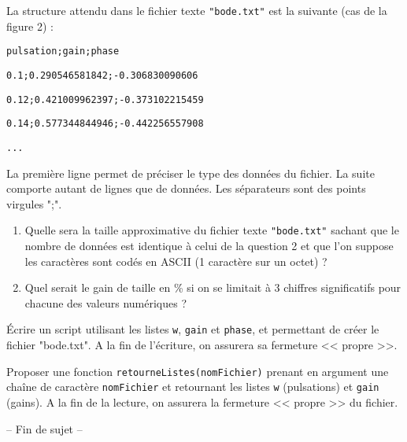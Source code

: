 La structure attendu dans le fichier texte \texttt{"bode.txt"} est la suivante (cas de la figure 2) :

\begin{dBox}
\hspace{0.5 cm} \texttt{pulsation;gain;phase}

\texttt{0.1;0.290546581842;-0.306830090606}

\texttt{0.12;0.421009962397;-0.373102215459}

\texttt{0.14;0.577344844946;-0.442256557908}

\texttt{...}
\end{dBox}

\begin{remark}
La première ligne permet de préciser le type des données du fichier.
La suite comporte autant de lignes que de données. Les séparateurs sont des points virgules ";".
\end{remark}

 
\question{}
\begin{enumerate}
\item Quelle sera la taille approximative du fichier texte \texttt{"bode.txt"} sachant que le nombre de données est identique à celui de la question 2 et que l'on suppose les caractères sont codés en ASCII (1 caractère sur un octet) ?
\item Quel serait le gain de taille en \% si on se limitait à 3 chiffres significatifs pour chacune des valeurs numériques ?
\end{enumerate}
 

 
\question{} Écrire un script utilisant les listes \texttt{w}, \texttt{gain} et \texttt{phase}, et permettant de créer le fichier "bode.txt". A la fin de l'écriture, on assurera sa fermeture << propre >>.
 

 
\question{} Proposer une fonction \texttt{retourneListes(nomFichier)} prenant en argument une chaîne de caractère \texttt{nomFichier} et retournant les listes \texttt{w} (pulsations) et \texttt{gain} (gains). A la fin de la lecture, on assurera la fermeture << propre >> du fichier.
 

\vspace{3 cm}

\begin{center}
-- Fin de sujet --
\end{center}

\vfill


